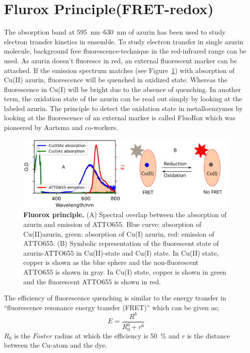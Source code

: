 \documentclass[11pt,a4paper,onecolumn]{article}
\begin{document}
\section{Flurox Principle(FRET-redox)}
The absorption band at \SIrange{595}{630}{\nm} of azurin has been used to study electron transfer kinetics in ensemble.
To study electron transfer in single azurin molecule, background free fluorescence-technique in the red-infrared range can be used.
As azurin doesn't fluoresce in red, an external fluorescent marker can be attached.
If the emission spectrum matches (see Figure~\ref{fig:flurox_azurin}) with absorption of Cu(II) azurin, fluorescence will be quenched in oxidized state.
Whereas the fluorescence in Cu(I) will be bright due to the absence of quenching.
In another term, the oxidation state of the azurin can be read out simply by looking at the labeled azurin.
The principle to detect the oxidation state in metalloenzymes by looking at the fluorescence of an external marker is called FluoRox which was pioneered by Aartsma and co-workers.\cite{kuznetsova2008the,goldsmith2011redox,tabares2011fluorescence}
\begin{figure}
	\centering
	\includegraphics[width=\textwidth]{flurox_azurin}
	\caption{\textbf{Fluorox principle.} (A) Spectral overlap between the absorption of azurin and emission of ATTO655. Blue curve: absorption of Cu(II)azurin, green: absorption of Cu(I) azurin, red: emission of ATTO655.
	(B) Symbolic representation of the fluorescent state of azurin-ATTO655 in Cu(II)-state and Cu(I) state. In Cu(II) state, copper is shown as the blue sphere and the non-fluorescent ATTO655 is shown in gray. In Cu(I) state, copper is shown in green and the fluorescent ATTO655 is shown in red.}
	\label{fig:flurox_azurin}
\end{figure}
The efficiency of fluorescence quenching is similar to the energy transfer in ``fluorescence resonance energy transfer (FRET)'' which can be given as;
\begin{equation}
	E = \frac{R^6}{R_0^6 + r^6}	
\end{equation}
$R_0$ is the $F\ddot{o}ster$ radius at which the efficiency is \SI{50}{\percent} and $r$ is the distance between the Cu-atom and the dye.
\end{document}
